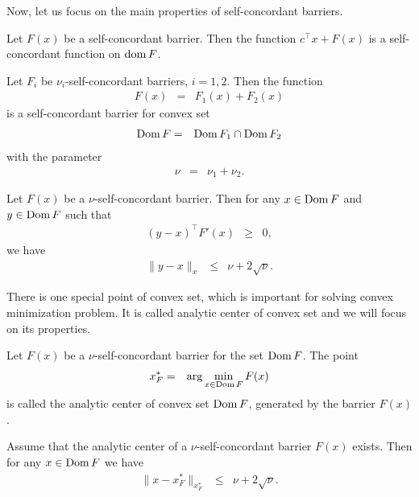 Now, let us focus on the main properties of self-concordant barriers.

\begin{theorem}
  Let $F(x)$ be a self-concordant barrier. Then the function $c^\top x + F(x)$ is a self-concordant function on $\operatorname{dom} F$.
\end{theorem}

\begin{theorem}
  Let $F_i$ be $\nu_i$-self-concordant barriers, $i = 1,2$. Then the function
  \begin{eqnarray}
    F(x) &=& F_1(x) + F_2(x)
  \end{eqnarray}
  is a self-concordant barrier for convex set
  \begin{eqnarray}
    \operatorname{Dom} F &=& \operatorname{Dom} F_1 \cap \operatorname{Dom} F_2
  \end{eqnarray}
  with the parameter
  \begin{eqnarray}
    \nu &=& \nu_1 + \nu_2.
  \end{eqnarray}
\end{theorem}

\begin{theorem}
  Let $F(x)$ be a $\nu$-self-concordant barrier. Then for any $x\in\operatorname{Dom} F$ and $y\in\operatorname{Dom} F$ such that
  \begin{eqnarray}
    (y-x)^\top F'(x) &\geq& 0,
  \end{eqnarray}
  we have
  \begin{eqnarray}
    \|y-x\|_x &\leq& \nu + 2\sqrt{\nu}.
  \end{eqnarray}
\end{theorem}

There is one special point of convex set, which is important for solving convex minimization problem. 
It is called analytic center of convex set and we will focus on its properties.

\begin{definition}
  Let $F(x)$ be a $\nu$-self-concordant barrier for the set $\operatorname{Dom} F$. The point
  \begin{eqnarray}
    x^*_F &=& \arg \min_{x\in\Dom F} F(x) \labeleq{SDP:scb:ac}
  \end{eqnarray}
  is called the analytic center of convex set $\operatorname{Dom} F$, generated by the barrier $F(x)$.
\end{definition}

\begin{theorem}
  Assume that the analytic center of a $\nu$-self-concordant barrier $F(x)$ exists. Then for any $x\in\operatorname{Dom} F$ we have
  \begin{eqnarray}
    \|x-x^*_F\|_{x^*_F} &\leq& \nu + 2\sqrt{\nu}.
  \end{eqnarray}
\end{theorem}

